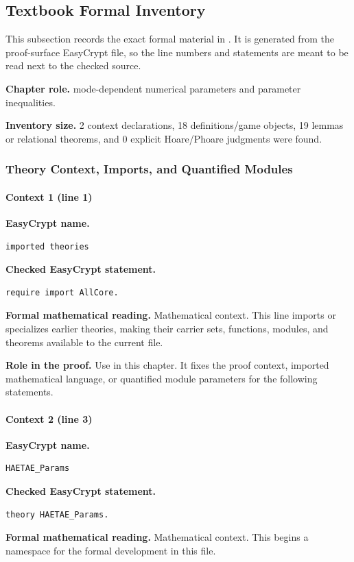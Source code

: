 \subsection*{Textbook Formal Inventory}
This subsection records the exact formal material in .  It is generated from the proof-surface EasyCrypt file, so the line numbers and statements are meant to be read next to the checked source.

\noindent\textbf{Chapter role.} mode-dependent numerical parameters and parameter inequalities.

\noindent\textbf{Inventory size.} 2 context declarations, 18 definitions/game objects, 19 lemmas or relational theorems, and 0 explicit Hoare/Phoare judgments were found.

\subsubsection*{Theory Context, Imports, and Quantified Modules}
\paragraph{Context 1 (line 1)}
\noindent\textbf{EasyCrypt name.}
\begin{lstlisting}[language=EasyCrypt,basicstyle=\ttfamily\scriptsize]
imported theories
\end{lstlisting}
\noindent\textbf{Checked EasyCrypt statement.}
\begin{lstlisting}[language=EasyCrypt,basicstyle=\ttfamily\scriptsize]
require import AllCore.
\end{lstlisting}
\noindent\textbf{Formal mathematical reading.}
Mathematical context. This line imports or specializes earlier theories, making their carrier sets, functions, modules, and theorems available to the current file.

\noindent\textbf{Role in the proof.}
Use in this chapter. It fixes the proof context, imported mathematical language, or quantified module parameters for the following statements.

\paragraph{Context 2 (line 3)}
\noindent\textbf{EasyCrypt name.}
\begin{lstlisting}[language=EasyCrypt,basicstyle=\ttfamily\scriptsize]
HAETAE_Params
\end{lstlisting}
\noindent\textbf{Checked EasyCrypt statement.}
\begin{lstlisting}[language=EasyCrypt,basicstyle=\ttfamily\scriptsize]
theory HAETAE_Params.
\end{lstlisting}
\noindent\textbf{Formal mathematical reading.}
Mathematical context. This begins a namespace for the formal development in this file.

